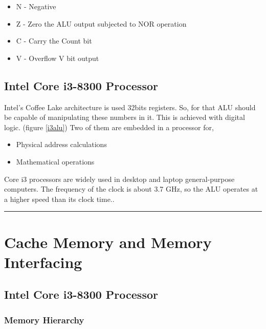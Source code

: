 \documentclass[a4paper,11pt]{article}
\begin{document}
\begin{itemize}
	\item 	N - Negative
\item	Z - Zero the ALU output subjected to NOR operation
\item 	C - Carry the Count bit
\item	V - Overflow V bit output
\end{itemize}

\subsection{Intel Core i3-8300 Processor}

Intel's Coffee Lake architecture is used 32bits registers. So, for that ALU should be capable of manipulating these numbers in it. This is achieved with digital logic. (figure \ref{i3alu}) Two of them are embedded in a processor for,
\begin{itemize}
	\item 	Physical address calculations
	\item	Mathematical operations

\end{itemize}

Core i3 processors are widely used in desktop and laptop general-purpose computers. The frequency of the clock is about 3.7 GHz, so the ALU operates at a higher speed than its clock time.\cite{howstuffworks}.


\vspace{1cm}\hrule
\section{Cache Memory and Memory Interfacing}

\subsection{Intel Core i3-8300 Processor}

\subsubsection{Memory Hierarchy}
\end{document}
